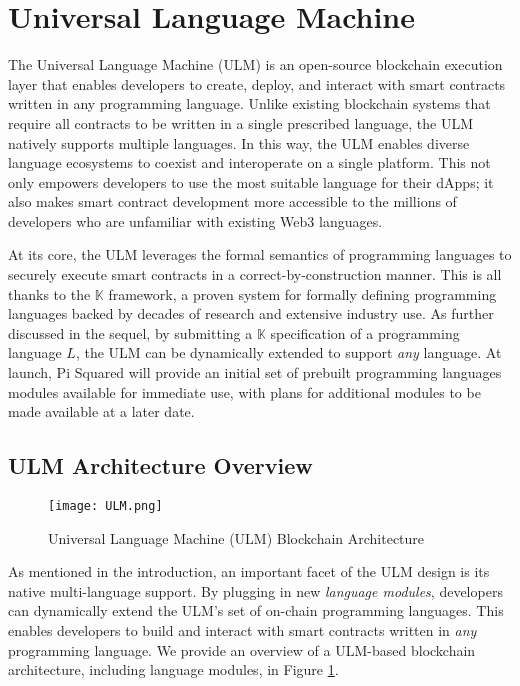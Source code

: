 \documentclass{article}
\newcommand{\ulm}{{ULM}}
\newcommand{\K}{\ensuremath{\mathbb{K}}}
\newcommand{\ps}{Pi Squared}
\begin{document}
\section{Universal Language Machine}


The Universal Language Machine (\ulm{}) is an open-source blockchain execution layer that enables developers to create, deploy, and interact with smart contracts written in any programming language.
Unlike existing blockchain systems that require all contracts to be written in a single prescribed language, the \ulm{} natively supports multiple languages.
In this way, the \ulm{} enables diverse language ecosystems to coexist and interoperate on a single platform.
This not only empowers developers to use the most suitable language for their dApps; it also makes smart contract development more accessible to the millions of developers who are unfamiliar with existing Web3 languages.

At its core, the \ulm{} leverages the formal semantics of programming languages to securely execute smart contracts in a correct-by-construction manner.
This is all thanks to the \K{} framework, a proven system for formally defining programming languages backed by decades of research and extensive industry use.
As further discussed in the sequel, by submitting a \K{} specification of a programming language $L$, the \ulm{} can be dynamically extended to support \textit{any} language.
At launch, \ps{} will provide an initial set of prebuilt programming languages modules available for immediate use, with plans for additional modules to be made available at a later date.

\subsection{\ulm{} Architecture Overview}

\begin{figure}
\centering
\texttt{[image: ULM.png]}
\caption{Universal Language Machine (ULM) Blockchain Architecture}
\label{arch-figure}
\end{figure}

As mentioned in the introduction, an important facet of the \ulm{} design is its native multi-language support.
By plugging in new \emph{language modules}, developers can dynamically extend the \ulm{}'s set of on-chain programming languages.
This enables developers to build and interact with smart contracts written in \emph{any} programming language.
We provide an overview of a \ulm{}-based blockchain architecture, including language modules, in Figure \ref{arch-figure}.
\end{document}
